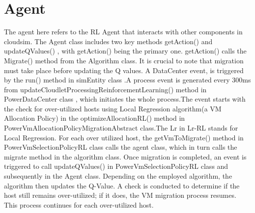 \documentclass[a4paper,12pt]{Classes/RoboticsLaTeX}
\begin{document}
       \section{Agent}
       The agent here refers to the RL Agent that interacts with other components  in cloudsim. The Agent class includes two key methods getAction() and updateQValues() , with getAction() being the primary one. getAction() calls the Migrate() method from the Algorithm class.\cite{Lukethesis} It is crucial to note that migration must take place before updating the Q values. A DataCenter event, is triggered by the run() method in simEntity class .A process event is generated every 300ms from updateCloudletProcessingReinforcementLearning() method in PowerDataCenter class , which initiates the whole  process.The event starts with the check for over-utilized hosts using Local Regression algorithm(a VM Allocation Policy) in the optimizeAllocationRL() method in PowerVmAllocationPolicyMigrationAbstract class.The Lr in Lr-RL stands for Local Regression. For each over utilized host, the getVmToMigrate() method in  PowerVmSelectionPolicyRL class calls the agent class, which in turn calls the migrate method in the algorithm class. Once migration is completed, an event is triggered to call updateQValues() in PowerVmSelectionPolicyRL class and subsequently in the Agent class. Depending on the employed algorithm, the algorithm then updates the Q-Value. A check is conducted to determine if the host still remains over-utilized; if it does, the VM migration process resumes. This process  continues  for each over-utilized host.
\end{document}

